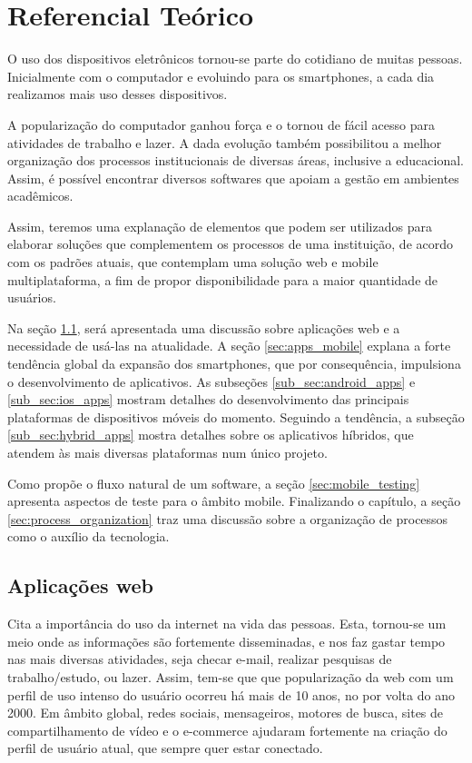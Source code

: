 \chapter{Referencial Teórico}


O uso dos dispositivos eletrônicos tornou-se parte do cotidiano de muitas pessoas. Inicialmente com o computador e evoluindo para os smartphones, a cada dia realizamos mais uso desses dispositivos.


A popularização do computador ganhou força e o tornou de fácil acesso para atividades de trabalho e lazer. A dada evolução também possibilitou a melhor organização dos processos institucionais de diversas áreas, inclusive a educacional. Assim, é possível encontrar diversos softwares que apoiam a gestão em ambientes acadêmicos. 


Assim, teremos uma explanação de elementos que podem ser utilizados para elaborar soluções que complementem os processos de uma instituição, de acordo com os padrões atuais, que contemplam uma solução web e mobile multiplataforma, a fim de propor disponibilidade para a maior quantidade de usuários.


Na seção \ref{sec:apps_web}, será apresentada uma discussão sobre aplicações web e a necessidade de usá-las na atualidade. A seção \ref{sec:apps_mobile} explana a forte tendência global da expansão dos smartphones, que por consequência, impulsiona o desenvolvimento de aplicativos. As subseções \ref{sub_sec:android_apps} e \ref{sub_sec:ios_apps} mostram detalhes do desenvolvimento das principais plataformas de dispositivos móveis do momento. Seguindo a tendência, a subseção \ref{sub_sec:hybrid_apps} mostra detalhes sobre os aplicativos híbridos, que atendem às mais diversas plataformas num único projeto.

Como propõe o fluxo natural de um software, a seção \ref{sec:mobile_testing} apresenta aspectos de teste para o âmbito mobile. Finalizando o capítulo, a seção \ref{sec:process_organization} traz uma discussão sobre a organização de processos como o auxílio da tecnologia.


\section{Aplicações web}\label{sec:apps_web}


\cite{Slone:2007:ITC:1229015.1229023} Cita a importância do uso da internet na vida das pessoas. Esta, tornou-se um meio onde as informações são fortemente disseminadas, e nos faz gastar tempo nas mais diversas atividades, seja checar e-mail, realizar pesquisas de trabalho/estudo, ou lazer. Assim, tem-se que que popularização da web com um perfil de uso intenso do usuário ocorreu há mais de 10 anos, no por volta do ano 2000. Em âmbito global, redes sociais, mensageiros, motores de busca, sites de compartilhamento de vídeo e o e-commerce ajudaram fortemente na criação do perfil de usuário atual, que sempre quer estar conectado. 


